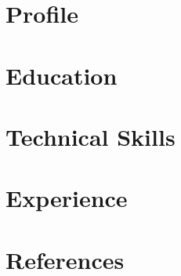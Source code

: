 \documentclass[11pt, a4paper, roman]{moderncv}
\begin{document}
\maketitle

\section{Profile}


\section{Education}


\section{Technical Skills}

\pagebreak

\section{Experience}


\section{References}

\end{document}
